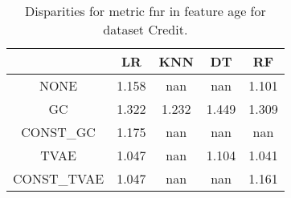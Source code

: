 \begin{table}
\caption{Disparities for metric fnr in feature age for dataset Credit.}
\label{tab:disp-CREDIT-age-fnr}
\begin{tabular}{ccccc}
\toprule
 & LR & KNN & DT & RF \\
\midrule
NONE & 1.158 & nan & nan & 1.101 \\
GC & 1.322 & 1.232 & 1.449 & 1.309 \\
CONST\_GC & 1.175 & nan & nan & nan \\
TVAE & 1.047 & nan & 1.104 & 1.041 \\
CONST\_TVAE & 1.047 & nan & nan & 1.161 \\
\bottomrule
\end{tabular}
\end{table}
